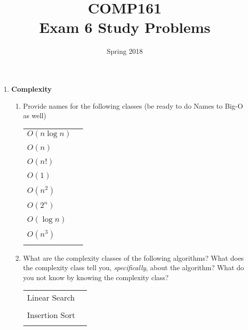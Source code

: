 \documentclass[nobib]{tufte-handout}
\title{COMP161 \\ Exam 6 Study Problems}
\author{}
\date{Spring 2018}
\begin{document}
\maketitle

\begin{enumerate}
  \item \textbf{Complexity}
    \begin{enumerate}
      \item Provide names for the following classes (be ready to do  Names to Big-O as well)
      \vspace{.2in}
      \begin{center}
        \begin{tabular}{ll}
          \( O(n \log n) \) & \underline{\hspace{3in}} \\ \\
          \( O(n) \) & \underline{\hspace{3in}} \\ \\
          \( O(n!) \) & \underline{\hspace{3in}} \\ \\
          \( O(1) \) & \underline{\hspace{3in}} \\ \\
          \( O(n^2) \) & \underline{\hspace{3in}} \\ \\
          \( O(2^n) \) & \underline{\hspace{3in}} \\ \\
          \( O(\log n) \) & \underline{\hspace{3in}} \\ \\
          \( O( n^3 ) \) & \underline{\hspace{3in}} \\ \\
        \end{tabular}
      \end{center}

      \item What are the complexity classes of the following algorithms? What does the complexity class tell you, \textit{specifically}, about the algorithm? What do you not know by knowing the complexity class?
      \vspace{.2in}
      \begin{center}
        \begin{tabular}{ll}
          Linear Search & \underline{\hspace{3in}} \\ \\
          Insertion Sort & \underline{\hspace{3in}} \\ \\
        \end{tabular}
      \end{center}
      \newpage \thispagestyle{empty}


\end{enumerate}
\end{enumerate}
\end{document}
